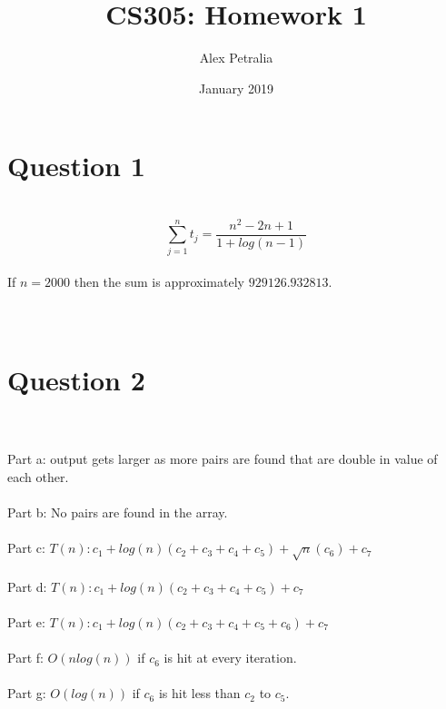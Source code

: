 \documentclass{article}
\title{CS305: Homework 1}
\author{Alex Petralia}
\date{January 2019}
\begin{document}
\maketitle

\section{Question 1}
\\
$$\sum_{j=1}^{n} t_j = \frac{n^2 - 2n +1}{1 + log(n-1)}$$
\\If $n = 2000$ then the sum is approximately $929126.932813$.
\\
\\
\\
\section{Question 2}
\\
\\Part a: output gets larger as more pairs are found that are double in value of each other.
\\
\\Part b: No pairs are found in the array.
\\
\\Part c: $T(n): c_1 + log(n)(c_2 + c_3 + c_4 + c_5) + \sqrt{n}(c_6) + c_7$ 
\\
\\Part d: $T(n): c_1 + log(n)(c_2 + c_3 + c_4 + c_5) + c_7$
\\
\\Part e: $T(n): c_1 + log(n)(c_2 + c_3 + c_4 + c_5 + c_6) + c_7$
\\
\\Part f: $O(nlog(n))$ if $c_6$ is hit at every iteration.
\\
\\Part g: $O(log(n))$ if $c_6$ is hit less than $c_2$ to $c_5$.
\end{document}
